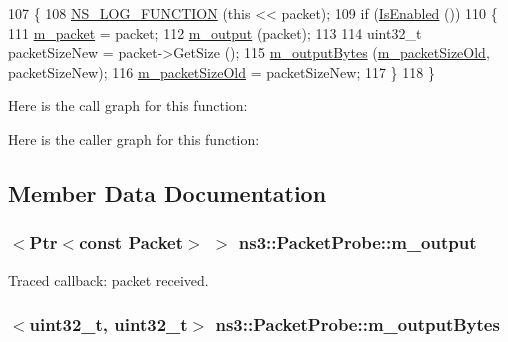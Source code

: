 \begin{DoxyCode}
107 \{
108   \hyperlink{log-macros-disabled_8h_a90b90d5bad1f39cb1b64923ea94c0761}{NS\_LOG\_FUNCTION} (\textcolor{keyword}{this} << packet);
109   \textcolor{keywordflow}{if} (\hyperlink{classns3_1_1Probe_a201d605485aaa1c96b973656d6eb56eb}{IsEnabled} ())
110     \{
111       \hyperlink{classns3_1_1PacketProbe_af6ad2ec589eda870946880a0dc515d35}{m\_packet} = packet;
112       \hyperlink{classns3_1_1PacketProbe_ac90f932731b8e93f8f9d202f072db2d6}{m\_output} (packet);
113 
114       uint32\_t packetSizeNew = packet->GetSize ();
115       \hyperlink{classns3_1_1PacketProbe_a22485607b7f497369b95649152fbab95}{m\_outputBytes} (\hyperlink{classns3_1_1PacketProbe_aba078a2a5cf2e954de40d29e851ff037}{m\_packetSizeOld}, packetSizeNew);
116       \hyperlink{classns3_1_1PacketProbe_aba078a2a5cf2e954de40d29e851ff037}{m\_packetSizeOld} = packetSizeNew;
117     \}
118 \}
\end{DoxyCode}


Here is the call graph for this function\+:




Here is the caller graph for this function\+:




\subsection{Member Data Documentation}
\subsubsection[{\texorpdfstring{m\+\_\+output}{m_output}}]{$<${\bf Ptr}$<$const {\bf Packet}$>$ $>$ ns3\+::\+Packet\+Probe\+::m\+\_\+output\hspace{0.3cm}{\ttfamily [private]}}\hypertarget{classns3_1_1PacketProbe_ac90f932731b8e93f8f9d202f072db2d6}{}\label{classns3_1_1PacketProbe_ac90f932731b8e93f8f9d202f072db2d6}


Traced callback\+: packet received. 

\subsubsection[{\texorpdfstring{m\+\_\+output\+Bytes}{m_outputBytes}}]{$<$uint32\+\_\+t, uint32\+\_\+t$>$ ns3\+::\+Packet\+Probe\+::m\+\_\+output\+Bytes\hspace{0.3cm}{\ttfamily [private]}}\hypertarget{classns3_1_1PacketProbe_a22485607b7f497369b95649152fbab95}{}\label{classns3_1_1PacketProbe_a22485607b7f497369b95649152fbab95}


